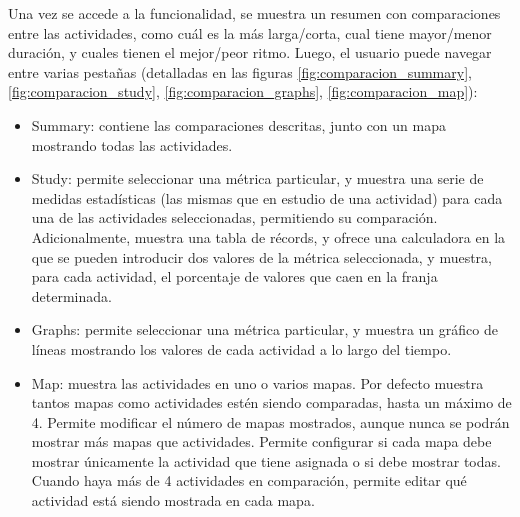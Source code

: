 Una vez se accede a la funcionalidad, se muestra un resumen con comparaciones entre las actividades, como cuál es la más larga/corta, cual tiene mayor/menor duración, y cuales tienen el mejor/peor ritmo. Luego, el usuario puede navegar entre varias pestañas (detalladas en las figuras \ref{fig:comparacion_summary}, \ref{fig:comparacion_study}, \ref{fig:comparacion_graphs}, \ref{fig:comparacion_map}):
\begin{itemize}
    \item Summary: contiene las comparaciones descritas, junto con un mapa mostrando todas las actividades.
    \item Study: permite seleccionar una métrica particular, y muestra una serie de medidas estadísticas (las mismas que en estudio de una actividad) para cada una de las actividades seleccionadas, permitiendo su comparación. Adicionalmente, muestra una tabla de récords, y ofrece una calculadora en la que se pueden introducir dos valores de la métrica seleccionada, y muestra, para cada actividad, el porcentaje de valores que caen en la franja determinada.
    \item Graphs: permite seleccionar una métrica particular, y muestra un gráfico de líneas mostrando los valores de cada actividad a lo largo del tiempo.
    \item Map: muestra las actividades en uno o varios mapas. Por defecto muestra tantos mapas como actividades estén siendo comparadas, hasta un máximo de 4. Permite modificar el número de mapas mostrados, aunque nunca se podrán mostrar más mapas que actividades. Permite configurar si cada mapa debe mostrar únicamente la actividad que tiene asignada o si debe mostrar todas. Cuando haya más de 4 actividades en comparación, permite editar qué actividad está siendo mostrada en cada mapa.
\end{itemize}

